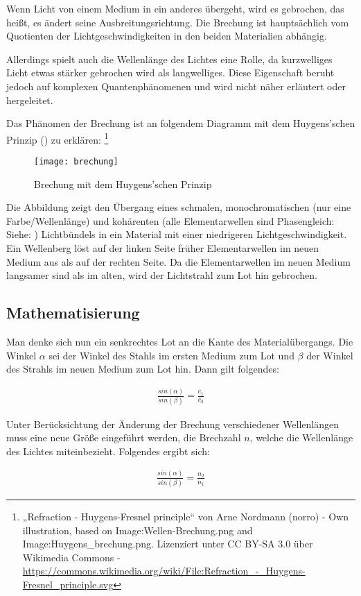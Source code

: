 Wenn Licht von einem Medium in ein anderes übergeht, wird es gebrochen, das heißt, es ändert seine Ausbreitungsrichtung. Die Brechung ist hauptsächlich vom Quotienten der Lichtgeschwindigkeiten in den beiden Materialien abhängig.

Allerdings spielt auch die Wellenlänge des Lichtes eine Rolle, da kurzwelliges Licht etwas stärker gebrochen wird als langwelliges. Diese Eigenschaft beruht jedoch auf komplexen Quantenphänomenen und wird nicht näher erläutert oder hergeleitet.

Das Phänomen der Brechung ist an folgendem Diagramm mit dem Huygens'schen Prinzip () zu erklären: \footnote{„Refraction - Huygens-Fresnel principle“ von Arne Nordmann (norro) - Own illustration, based on Image:Wellen-Brechung.png and Image:Huygens\_brechung.png. Lizenziert unter CC BY-SA 3.0 über Wikimedia Commons - \url{https://commons.wikimedia.org/wiki/File:Refraction\_-\_Huygens-Fresnel\_principle.svg}}

\begin{figure}[!h]
	\center
	\texttt{[image: brechung]}
	\caption{Brechung mit dem Huygens'schen Prinzip}
	\label{fig:brechung}
\end{figure}

Die Abbildung zeigt den Übergang eines schmalen, monochromatischen (nur eine Farbe/Wellenlänge) und kohärenten (alle Elementarwellen sind Phasengleich: Siehe: ) Lichtbündels in ein Material mit einer niedrigeren Lichtgeschwindigkeit. Ein Wellenberg löst auf der linken Seite früher Elementarwellen im neuen Medium aus als auf der rechten Seite. Da die Elementarwellen im neuen Medium langsamer sind als im alten, wird der Lichtstrahl zum Lot hin gebrochen.

\subsection{Mathematisierung}

Man denke sich nun ein senkrechtes Lot an die Kante des Materialübergangs. Die Winkel $\alpha$ sei der Winkel des Stahls im ersten Medium zum Lot und $\beta$ der Winkel des Strahls im neuen Medium zum Lot hin. Dann gilt folgendes:
	
	\begin{align}
		\frac{sin{(\alpha)}}{sin{(\beta)}} = \frac{c_1}{c_2}
	\end{align}
	
Unter Berücksichtung der Änderung der Brechung verschiedener Wellenlängen muss eine neue Größe eingeführt werden, die Brechzahl $n$, welche die Wellenlänge des Lichtes miteinbezieht. Folgendes ergibt sich:
	
	\begin{align} \label{eq:brechungsgesetz}
		\frac{sin{(\alpha)}}{sin{(\beta)}} = \frac{n_2}{n_1}
	\end{align}